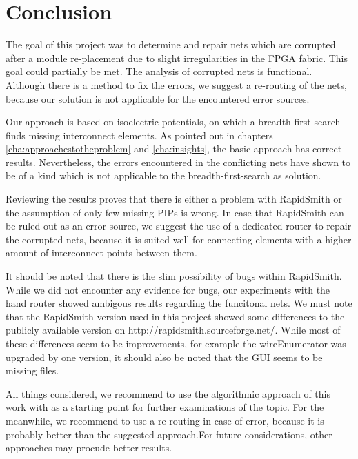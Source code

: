 \chapter{Conclusion}
\label{cha:conclusion}

The goal of this project was to determine and repair nets which are corrupted after a module re-placement due to slight irregularities in the FPGA fabric. This goal could partially be met. The analysis of corrupted nets is functional. Although there is a method to fix the errors, we suggest a re-routing of the nets, because our solution is not applicable for the encountered error sources.

Our approach is based on isoelectric potentials, on which a breadth-first search finds missing interconnect elements. As pointed out in chapters \ref{cha:approachestotheproblem} and \ref{cha:insights}, the basic approach has correct results. Nevertheless, the errors encountered in the conflicting nets have shown to be of a kind which is not applicable to the breadth-first-search as solution. 

Reviewing the results proves that there is either a problem with RapidSmith or the assumption of only few missing PIPs is wrong. In case that RapidSmith can be ruled out as an error source, we suggest the use of a dedicated router to repair the corrupted nets, because it is suited well for connecting elements with a higher amount of interconnect points between them.

It should be noted that there is the slim possibility of bugs within RapidSmith. While we did not encounter any evidence for bugs, our experiments with the hand router showed ambigous results regarding the funcitonal nets. We must note that the RapidSmith version used in this project showed some differences to the publicly available version on http://rapidsmith.sourceforge.net/. While most of these differences seem to be improvements, for example the wireEnumerator was upgraded by one version, it should also be noted that the GUI seems to be missing files.

All things considered, we recommend to use the algorithmic approach of this work with as a starting point for further examinations of the topic. For the meanwhile, we recommend to use a re-routing in case of error, because it is probably better than the suggested approach.For future considerations, other approaches may procude better results.



